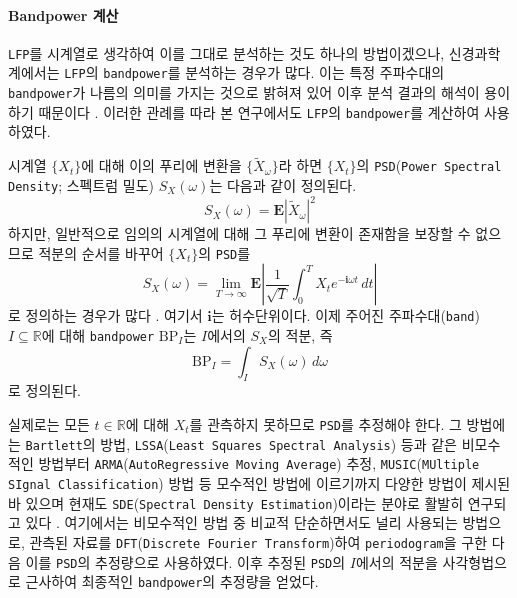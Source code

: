 \documentclass[10pt,onecolumn,twoside,a4size]{gsag3jnl}
\begin{document}
\paragraph{Bandpower 계산}

\texttt{LFP}를 시계열로 생각하여 이를 그대로 분석하는 것도 하나의 방법이겠으나, 신경과학계에서는 \texttt{LFP}의 \texttt{bandpower}를 분석하는 경우가 많다. 이는 특정 주파수대의 \texttt{bandpower}가 나름의 의미를 가지는 것으로 밝혀져 있어 이후 분석 결과의 해석이 용이하기 때문이다 \texttt{\citep{subha2010eeg}}. 이러한 관례를 따라 본 연구에서도 \texttt{LFP}의 \texttt{bandpower}를 계산하여 사용하였다.

시계열 $\{X_t\}$에 대해 이의 푸리에 변환을 $\{\widetilde{X}_\omega\}$라 하면 $\{X_t\}$의 \texttt{PSD}(\texttt{Power Spectral Density}; 스펙트럼 밀도) $S_X(\omega)$는 다음과 같이 정의된다.
\begin{equation}
  S_X(\omega)=\mathbf{E}|\widetilde{X}_\omega|^2
\end{equation}
하지만, 일반적으로 임의의 시계열에 대해 그 푸리에 변환이 존재함을 보장할 수 없으므로 적분의 순서를 바꾸어 $\{X_t\}$의 \texttt{PSD}를
\begin{equation}
  S_X(\omega)=\lim_{T\to\infty}\mathbf{E}\left|\frac{1}{\sqrt{T}}\int_0^TX_te^{-\mathbf{i}\omega t}\,dt\right|
\end{equation}
로 정의하는 경우가 많다 \texttt{\citep{miller2012probability}}. 여기서 $\mathbf{i}$는 허수단위이다. 이제 주어진 주파수대(\texttt{band}) $I\subseteq\mathbb{R}$에 대해 \texttt{bandpower} $\mathrm{BP}_I$는 $I$에서의 $S_X$의 적분, 즉
\begin{equation}
  \mathrm{BP}_I=\int_IS_X(\omega)\,d\omega
\end{equation}
로 정의된다.

실제로는 모든 $t\in\mathbb{R}$에 대해 $X_t$를 관측하지 못하므로 \texttt{PSD}를 추정해야 한다. 그 방법에는 \texttt{Bartlett}의 방법, \texttt{LSSA}(\texttt{Least Squares Spectral Analysis}) 등과 같은 비모수적인 방법부터 \texttt{ARMA}(\texttt{AutoRegressive Moving Average}) 추정, \texttt{MUSIC}(\texttt{MUltiple SIgnal Classification}) 방법 등 모수적인 방법에 이르기까지 다양한 방법이 제시된 바 있으며 현재도 \texttt{SDE}(\texttt{Spectral Density Estimation})이라는 분야로 활발히 연구되고 있다 \texttt{\citep{stoica2005spectral}}. 여기에서는 비모수적인 방법 중 비교적 단순하면서도 널리 사용되는 방법으로, 관측된 자료를 \texttt{DFT}(\texttt{Discrete Fourier Transform})하여 \texttt{periodogram}을 구한 다음 이를 \texttt{PSD}의 추정량으로 사용하였다. 이후 추정된 \texttt{PSD}의 $I$에서의 적분을 사각형법으로 근사하여 최종적인 \texttt{bandpower}의 추정량을 얻었다.
\end{document}
